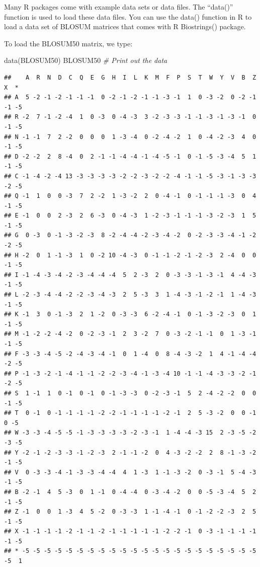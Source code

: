 \documentclass[
]{book}
\newenvironment{Shaded}{\begin{snugshade}}{\end{snugshade}}
\newcommand{\CommentTok}[1]{\textcolor[rgb]{0.56,0.35,0.01}{\textit{#1}}}
\newcommand{\FunctionTok}[1]{\textcolor[rgb]{0.00,0.00,0.00}{#1}}
\newcommand{\NormalTok}[1]{#1}
\begin{document}
Many R packages come with example data sets or data files. The ``data()'' function is used to load these data files. You can use the data() function in R to load a data set of BLOSUM matrices that comes with R Biostrings() package.

To load the BLOSUM50 matrix, we type:

\begin{Shaded}
\begin{Highlighting}[]
\FunctionTok{data}\NormalTok{(BLOSUM50)}
\NormalTok{BLOSUM50 }\CommentTok{\# Print out the data}
\end{Highlighting}
\end{Shaded}

\begin{verbatim}
##    A  R  N  D  C  Q  E  G  H  I  L  K  M  F  P  S  T  W  Y  V  B  Z  X  *
## A  5 -2 -1 -2 -1 -1 -1  0 -2 -1 -2 -1 -1 -3 -1  1  0 -3 -2  0 -2 -1 -1 -5
## R -2  7 -1 -2 -4  1  0 -3  0 -4 -3  3 -2 -3 -3 -1 -1 -3 -1 -3 -1  0 -1 -5
## N -1 -1  7  2 -2  0  0  0  1 -3 -4  0 -2 -4 -2  1  0 -4 -2 -3  4  0 -1 -5
## D -2 -2  2  8 -4  0  2 -1 -1 -4 -4 -1 -4 -5 -1  0 -1 -5 -3 -4  5  1 -1 -5
## C -1 -4 -2 -4 13 -3 -3 -3 -3 -2 -2 -3 -2 -2 -4 -1 -1 -5 -3 -1 -3 -3 -2 -5
## Q -1  1  0  0 -3  7  2 -2  1 -3 -2  2  0 -4 -1  0 -1 -1 -1 -3  0  4 -1 -5
## E -1  0  0  2 -3  2  6 -3  0 -4 -3  1 -2 -3 -1 -1 -1 -3 -2 -3  1  5 -1 -5
## G  0 -3  0 -1 -3 -2 -3  8 -2 -4 -4 -2 -3 -4 -2  0 -2 -3 -3 -4 -1 -2 -2 -5
## H -2  0  1 -1 -3  1  0 -2 10 -4 -3  0 -1 -1 -2 -1 -2 -3  2 -4  0  0 -1 -5
## I -1 -4 -3 -4 -2 -3 -4 -4 -4  5  2 -3  2  0 -3 -3 -1 -3 -1  4 -4 -3 -1 -5
## L -2 -3 -4 -4 -2 -2 -3 -4 -3  2  5 -3  3  1 -4 -3 -1 -2 -1  1 -4 -3 -1 -5
## K -1  3  0 -1 -3  2  1 -2  0 -3 -3  6 -2 -4 -1  0 -1 -3 -2 -3  0  1 -1 -5
## M -1 -2 -2 -4 -2  0 -2 -3 -1  2  3 -2  7  0 -3 -2 -1 -1  0  1 -3 -1 -1 -5
## F -3 -3 -4 -5 -2 -4 -3 -4 -1  0  1 -4  0  8 -4 -3 -2  1  4 -1 -4 -4 -2 -5
## P -1 -3 -2 -1 -4 -1 -1 -2 -2 -3 -4 -1 -3 -4 10 -1 -1 -4 -3 -3 -2 -1 -2 -5
## S  1 -1  1  0 -1  0 -1  0 -1 -3 -3  0 -2 -3 -1  5  2 -4 -2 -2  0  0 -1 -5
## T  0 -1  0 -1 -1 -1 -1 -2 -2 -1 -1 -1 -1 -2 -1  2  5 -3 -2  0  0 -1  0 -5
## W -3 -3 -4 -5 -5 -1 -3 -3 -3 -3 -2 -3 -1  1 -4 -4 -3 15  2 -3 -5 -2 -3 -5
## Y -2 -1 -2 -3 -3 -1 -2 -3  2 -1 -1 -2  0  4 -3 -2 -2  2  8 -1 -3 -2 -1 -5
## V  0 -3 -3 -4 -1 -3 -3 -4 -4  4  1 -3  1 -1 -3 -2  0 -3 -1  5 -4 -3 -1 -5
## B -2 -1  4  5 -3  0  1 -1  0 -4 -4  0 -3 -4 -2  0  0 -5 -3 -4  5  2 -1 -5
## Z -1  0  0  1 -3  4  5 -2  0 -3 -3  1 -1 -4 -1  0 -1 -2 -2 -3  2  5 -1 -5
## X -1 -1 -1 -1 -2 -1 -1 -2 -1 -1 -1 -1 -1 -2 -2 -1  0 -3 -1 -1 -1 -1 -1 -5
## * -5 -5 -5 -5 -5 -5 -5 -5 -5 -5 -5 -5 -5 -5 -5 -5 -5 -5 -5 -5 -5 -5 -5  1
\end{verbatim}
\end{document}
